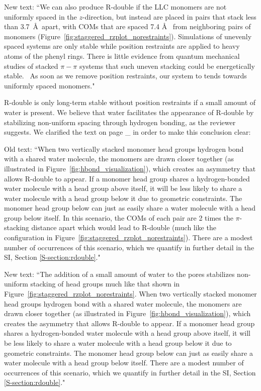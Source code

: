 \documentclass{article}
\begin{document}
\begin{enumerate}
    New text: ``We can also produce R-double if the LLC monomers are not
    uniformly spaced in the $z$-direction, but instead are placed in pairs that
    stack less than 3.7~\AA~apart, with COMs that are spaced 7.4 \AA~ from
    neighboring pairs of monomers (Figure~\ref{fig:staggered_rzplot_norestraints}).
    Simulations of unevenly spaced systems are only stable while position
    restraints are applied to heavy atoms of the phenyl rings. There is little
    evidence from quantum mechanical studies of stacked $\pi-\pi$ systems that such
    uneven stacking could be energetically stable.~\cite{tauer_beyond_2005} As soon
    as we remove position restraints, our system to tends towards uniformly spaced
    monomers."

    R-double is only long-term stable without position restraints if a small
    amount of water is present. We believe that water facilitates the appearance
    of R-double by stabilizing non-uniform spacing through hydrogen bonding, as the
    reviewer suggests. We clarified the text on page _ in order to make this 
    conclusion clear:

    Old text: ``When two vertically stacked monomer head groups hydrogen bond
    with a shared water molecule, the monomers are drawn closer together (as
    illustrated in Figure~\ref{fig:hbond_visualization}), which creates an
    asymmetry that allows R-double to appear. If a monomer head group shares a
    hydrogen-bonded water molecule with a head group above itself, it will be less
    likely to share a water molecule with a head group below it due to geometric
    constraints. The monomer head group below can just as easily share a water
    molecule with a head group below itself. In this scenario, the COMs of each
    pair are 2 times the $\pi$-stacking distance apart which would lead to R-double
    (much like the configuration in
     Figure~\ref{fig:staggered_rzplot_norestraints}). There are a modest number of
    occurrences of this scenario, which we quantify in further detail in the SI,
    Section \ref{S-section:rdouble}."

    New text: ``The addition of a small amount of water to the pores stabilizes
    non-uniform stacking of head groups much like that shown in
    Figure~\ref{fig:staggered_rzplot_norestraints}. When two vertically stacked
    monomer head groups hydrogen bond with a shared water molecule, the monomers
    are drawn closer together (as illustrated in
    Figure~\ref{fig:hbond_visualization}), which creates the asymmetry that allows
    R-double to appear. If a monomer head group shares a hydrogen-bonded water
    molecule with a head group above itself, it will be less likely to share a
    water molecule with a head group below it due to geometric constraints. The
    monomer head group below can just as easily share a water molecule with a head
    group below itself. There are a modest number of occurrences of this scenario,
    which we quantify in further detail in the SI, Section
    \ref{S-section:rdouble}."


\end{enumerate}
\end{document}
